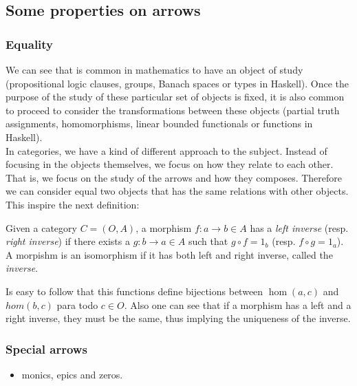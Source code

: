\subsection{Some properties on arrows}
\subsubsection{Equality}
We can see that is common in mathematics to have an object of study (propositional logic clauses, groups, Banach spaces or types in Haskell). Once the purpose of the study of these particular set of objects is fixed, it is also common to proceed to consider the transformations between these objects (partial truth assignments, homomorphisms, linear bounded functionals or  functions in Haskell).\\

In categories, we have a kind of different approach to the subject. Instead of focusing in the objects themselves, we focus on how they relate to each other. That is, we focus on the study of the arrows and how they composes. Therefore we can consider equal two objects that has the same relations with other objects. This inspire the next definition:

\begin{definition}
  Given a category $C=(O,A)$, a morphism $f: a \to b \in A$ has a \emph{left inverse} (resp. \emph{right inverse}) if there exists a $g: b \to a \in A$ such that $g \circ f = 1_b$ (resp. $f \circ g = 1_a$). A morpishm is an isomorphism if it has both left and right inverse, called the \emph{inverse}. 
\end{definition}



Is easy to follow that this functions define bijections between $\hom(a,c)$ and $hom(b,c)$ para todo $c\in O$. Also one can see that if a morphism has a left and a right inverse, they must be the same, thus implying the uniqueness of the inverse.

\subsubsection{Special arrows}
\begin{itemize}
\item monics, epics and zeros.
\end{itemize}

